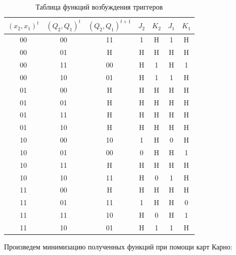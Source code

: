 \documentclass[a4paper,12pt]{article}
\begin{document}
    \begin{table}[H]
        \centering
        \begin{tabular}{|c|c|c|c|c|c|c|}
        \hline
        $(x_2, x_1)^t$ & $(Q_2, Q_1)^t$ & $(Q_2, Q_1)^{t+1}$ & $J_2$ & $K_2$ & $J_1$ & $K_1$ \\ \hline
        00             & 00             & 11                 & 1     & H     & 1     & H     \\ \hline
        00             & 01             & H                  & H     & H     & H     & H     \\ \hline
        00             & 11             & 00                 & H     & 1     & H     & 1     \\ \hline
        00             & 10             & 01                 & H     & 1     & 1     & H     \\ \Xhline{4\arrayrulewidth}
        01             & 00             & H                  & H     & H     & H     & H     \\ \hline
        01             & 01             & H                  & H     & H     & H     & H     \\ \hline
        01             & 11             & H                  & H     & H     & H     & H     \\ \hline
        01             & 10             & H                  & H     & H     & H     & H     \\ \Xhline{4\arrayrulewidth}
        10             & 00             & 10                 & 1     & H     & 0     & H     \\ \hline
        10             & 01             & 00                 & 0     & H     & H     & 1     \\ \hline
        10             & 11             & H                  & H     & H     & H     & H     \\ \hline
        10             & 10             & 11                 & H     & 0     & 1     & H     \\ \Xhline{4\arrayrulewidth}
        11             & 00             & H                  & H     & H     & H     & H     \\ \hline
        11             & 01             & 11                 & 1     & H     & H     & 0     \\ \hline
        11             & 11             & 10                 & H     & 0     & H     & 1     \\ \hline
        11             & 10             & 01                 & H     & 1     & 1     & H     \\ \hline
        \end{tabular}
        \caption{Таблица функций возбуждения триггеров}
        \label{tab:erection}
    \end{table}
    Произведем минимизацию полученных функций при помощи карт Карно:
\end{document}
